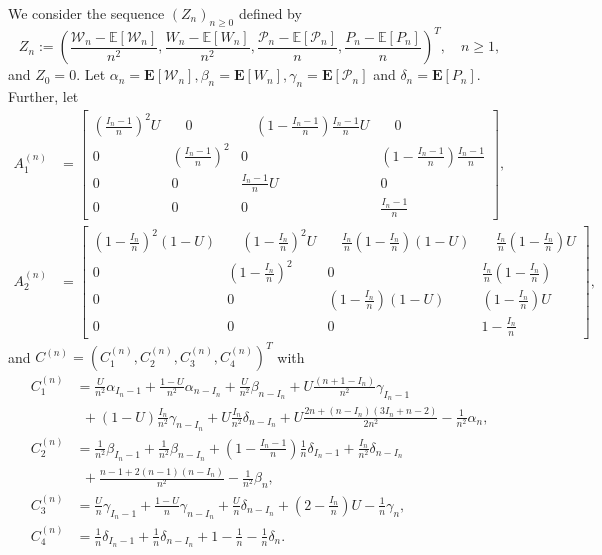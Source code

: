 \documentclass{amsart}       %
\newcommand{\Ew}{\ensuremath{\mathcal P}}
\newcommand{\Ww}{\ensuremath{\mathcal W}}
\newcommand{\E}[1]{\ensuremath{\mathbf{E} \left[#1 \right]}}
\begin{document}
\medskip We consider the sequence $(Z_n)_{n\geq0}$ defined by
\begin{equation*}
Z_n:=\left(\frac{\Ww_n-\mathbb{E}[\Ww_n]}{n^2},\frac{W_n-\mathbb{E}[W_n]}{n^2},\frac{\Ew_n-\mathbb{E}[\Ew_n]}{n},\frac{P_n-\mathbb{E}[P_n]}{n}\right)^{T}, \quad n \geq 1,
\end{equation*}
and $Z_0 = 0$. Let  $\alpha_n = \E{\Ww_n}, \beta_n = \E{W_n} , \gamma_n = \E{ \Ew_n}$ and $\delta_n = \E{P_n}$. Further, let
\begin{align*} A_1^{(n)}&=\left[\begin{array}{cccc} \left(\frac{I_n-1}{n}\right)^2 U &\quad 0&\quad \left(1-\frac{I_n-1}{n}\right)\frac{I_n-1}{n} U&\quad 0 \\0 & \left(\frac{I_n-1}{n}\right)^2& 0&
\left(1-\frac{I_n-1}{n}\right)\frac{I_n-1}{n}\\0 & 0& \frac{I_n-1}{n} U &
0\\0 & 0& 0&\frac{I_n-1}{n}
\end{array}\right],\\
A_2^{(n)}&=\left[\begin{array}{cccc}
\left(1-\frac{I_n}{n}\right)^2(1-U) &\quad
\left(1-\frac{I_n}{n}\right)^2 U &\quad
\frac{I_n}{n}\left(1-\frac{I_n}{n}\right) (1-U)&\quad
\frac{I_n}{n}\left(1-\frac{I_n}{n}\right) U
\\0 & \left(1-\frac{I_n}{n}\right)^2& 0& \frac{I_n}{n}\left(1-\frac{I_n}{n}\right)\\0 & 0& \left(1-\frac{I_n}{n}\right) (1-U)& \left(1-\frac{I_n}{n}\right) U \\0 & 0&
0&1-\frac{I_n}{n}
\end{array}\right], \end{align*}
and $C^{(n)}=(C_1^{(n)}, C_2^{(n)}, C_3^{(n)}, C_4^{(n)})^T$ with
\begin{align*}
  C_1^{(n)} & = \frac{U}{n^2}\alpha_{I_n-1}+\frac{1-U}{n^2}\alpha_{n-I_n}+\frac{U}{n^2}\beta_{n-I_n}+U\frac{(n+1-I_n)}{n^2}\gamma_{I_n-1}\\
& \: \:  +(1-U)\frac{I_n}{n^2}\gamma_{n-I_n} +U\frac{I_n} {n^2}\delta_{n-I_n} + U \frac{2n + (n-I_n)(3 I_n + n - 2)}{2n^2}-\frac{1}{n^2}\alpha_n,\\
C_2^{(n)} & =\frac{1}{n^2}\beta_{I_n-1}+\frac{1}{n^2}\beta_{n-I_n}+\left(1-\frac{I_n-1}{n}\right)\frac{1}{n}\delta_{I_n-1}+\frac{I_n}{n^2}\delta_{n-I_n}\\
& \: \:  +\frac{n-1+2(n-1)(n-I_n)}{n^2}-\frac{1}{n^2}\beta_n,\\
C_3^{(n)} & =\frac{U}{n}\gamma_{I_n-1}+\frac{1-U}{n}\gamma_{n-I_n}+\frac{U}{n}\delta_{n-I_n}+\left( 2 - \frac{I_n}{n} \right) U-\frac{1}{n}\gamma_n,\\
C_4^{(n)} & =\frac{1}{n}\delta_{I_n-1}+\frac{1}{n}\delta_{n-I_n}+ 1 - \frac{1}{n}-\frac{1}{n}\delta_n.
\end{align*}
\end{document}
